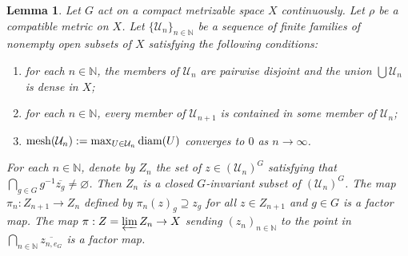 \documentclass[11pt]{amsart}
\newtheorem{lemma}[theorem]{Lemma}
\theoremstyle{definition}
\numberwithin{equation}{section}
\theoremstyle{definition}
\newcommand{\cU}{{\mathcal U}}
\newcommand{\Nb}{{\mathbb N}}
\newcommand{\diam}{{\rm diam}}
\begin{document}
\begin{lemma} \label{L-zero-dim extension}
Let $G$ act on a compact metrizable space $X$ continuously. Let $\rho$ be a compatible metric on $X$. Let $\{\cU_n\}_{n\in \Nb}$ be a sequence of finite families of nonempty open subsets of $X$ satisfying the following conditions:
\begin{enumerate}
\item[(a)] for each $n\in \Nb$, the members of $\cU_n$ are pairwise disjoint and the union $\bigcup \cU_n$ is dense in $X$;
\item[(b)] for each $n\in \Nb$, every member of $\cU_{n+1}$ is contained in some member of $\cU_n$;
\item[(c)] ${\rm mesh}(\cU_n):=\max_{U\in \cU_n}\diam(U)$ converges to $0$ as $n\to \infty$.
\end{enumerate}
For each $n\in \Nb$, denote by $Z_n$ the set of $z\in (\cU_n)^G$ satisfying that $\bigcap_{g\in G} g^{-1}\overline{z_g}\neq \varnothing$. Then $Z_n$ is a closed $G$-invariant subset of $(\cU_n)^G$.  The map $\pi_n: Z_{n+1}\rightarrow Z_n$ defined by $\pi_n(z)_g\supseteq z_g$ for all $z\in Z_{n+1}$ and $g\in G$ is a factor map. The map $\pi: Z=\varprojlim Z_n\rightarrow X$ sending $(z_n)_{n\in \Nb}$ to the point in $\bigcap_{n\in \Nb} \overline{z_{n, e_G}}$ is a factor map. 
\end{lemma}
\end{document}

